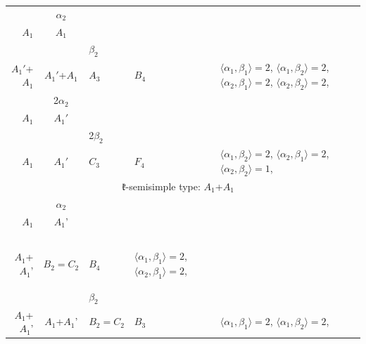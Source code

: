 \documentclass[12pt]{report}
\begin{document}
\begin{appendix}
{\begin{longtable}{rcl p{1cm}p{1cm}p{3cm} }
\\
\begin{tabular}{cc}$\alpha_1$+ & $\alpha_2$\\\tiny{ $A_1$ } & \tiny{ $A_1$ }\end{tabular} &\begin{tabular}{c} = \\~ \end{tabular} & \begin{tabular}{cc}$\beta_1$+ & $\beta_2$\\\tiny{ $A_1'$+$A_1$ } & \tiny{ $A_1'$+$A_1$ }\end{tabular} & $A_3$ & $B_4$ &  $\langle\alpha_1, \beta_1\rangle=2$, $\langle\alpha_1, \beta_2\rangle=2$, $\langle\alpha_2, \beta_1\rangle=2$, $\langle\alpha_2, \beta_2\rangle=2$, 
\\
\begin{tabular}{cc}$\alpha_1$+ & 2$\alpha_2$\\\tiny{ $A_1$ } & \tiny{ $A_1'$ }\end{tabular} &\begin{tabular}{c} = \\~ \end{tabular} & \begin{tabular}{cc}$\beta_1$+ & 2$\beta_2$\\\tiny{ $A_1$ } & \tiny{ $A_1'$ }\end{tabular} & $C_3$ & $F_4$ &  $\langle\alpha_1, \beta_2\rangle=2$, $\langle\alpha_2, \beta_1\rangle=2$, $\langle\alpha_2, \beta_2\rangle=1$, 
\\
\hline\multicolumn{5}{c}{$\mathfrak{k}$-semisimple type: $A_1$+$A_1$}\\
\hline\hline\begin{tabular}{cc}$\alpha_1$+ & $\alpha_2$\\\tiny{ $A_1$ } & \tiny{ $A_1$' }\end{tabular} &\begin{tabular}{c} = \\~ \end{tabular} & \begin{tabular}{c}$\beta_1$\\\tiny{ $A_1$+$A_1$' }\end{tabular} & $B_2=C_2$ & $B_4$ &  $\langle\alpha_1, \beta_1\rangle=2$, $\langle\alpha_2, \beta_1\rangle=2$, 
\\
\begin{tabular}{c}2$\alpha_1$\\\tiny{  }\end{tabular} &\begin{tabular}{c} = \\~ \end{tabular} & \begin{tabular}{cc}$\beta_1$+ & $\beta_2$\\\tiny{ $A_1$+$A_1$' } & \tiny{ $A_1$+$A_1$' }\end{tabular} & $B_2=C_2$ & $B_3$ &  $\langle\alpha_1, \beta_1\rangle=2$, $\langle\alpha_1, \beta_2\rangle=2$, 

\end{longtable}}
\end{appendix}
\end{document}
